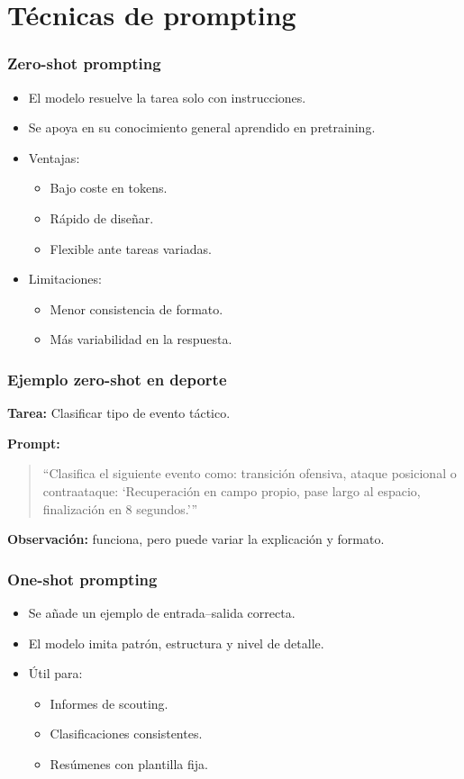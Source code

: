 \documentclass[aspectratio=169]{beamer}
\begin{document}

\section{Técnicas de prompting}
\frame{\sectionpage} 

\begin{frame}\frametitle{Zero-shot prompting}
\begin{itemize}
    \item El modelo resuelve la tarea solo con instrucciones.
    \item Se apoya en su conocimiento general aprendido en pretraining.
    \item Ventajas:
    \begin{itemize}
        \item Bajo coste en tokens.
        \item Rápido de diseñar.
        \item Flexible ante tareas variadas.
    \end{itemize}
    \item Limitaciones:
    \begin{itemize}
        \item Menor consistencia de formato.
        \item Más variabilidad en la respuesta.
    \end{itemize}
\end{itemize}
\end{frame}

\begin{frame}\frametitle{Ejemplo zero-shot en deporte}
\textbf{Tarea:} Clasificar tipo de evento táctico.

\textbf{Prompt:}
\begin{quote}
“Clasifica el siguiente evento como: transición ofensiva, ataque posicional o contraataque:  
‘Recuperación en campo propio, pase largo al espacio, finalización en 8 segundos.’”
\end{quote}

\textbf{Observación:} funciona, pero puede variar la explicación y formato.
\end{frame}

\begin{frame}\frametitle{One-shot prompting}
\begin{itemize}
    \item Se añade un ejemplo de entrada–salida correcta.
    \item El modelo imita patrón, estructura y nivel de detalle.
    \item Útil para:
    \begin{itemize}
        \item Informes de scouting.
        \item Clasificaciones consistentes.
        \item Resúmenes con plantilla fija.
    \end{itemize}
\end{itemize}
\end{frame}
\end{document}
